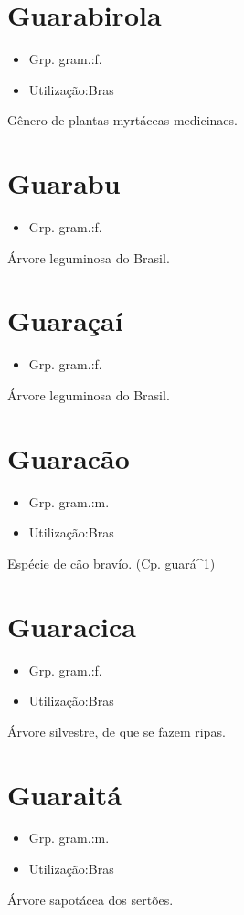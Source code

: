 \section{Guarabirola}
\begin{itemize}
\item {Grp. gram.:f.}
\end{itemize}
\begin{itemize}
\item {Utilização:Bras}
\end{itemize}
Gênero de plantas myrtáceas medicinaes.
\section{Guarabu}
\begin{itemize}
\item {Grp. gram.:f.}
\end{itemize}
Árvore leguminosa do Brasil.
\section{Guaraçaí}
\begin{itemize}
\item {Grp. gram.:f.}
\end{itemize}
Árvore leguminosa do Brasil.
\section{Guaracão}
\begin{itemize}
\item {Grp. gram.:m.}
\end{itemize}
\begin{itemize}
\item {Utilização:Bras}
\end{itemize}
Espécie de cão bravío.
(Cp. \textunderscore guará\textunderscore ^1)
\section{Guaracica}
\begin{itemize}
\item {Grp. gram.:f.}
\end{itemize}
\begin{itemize}
\item {Utilização:Bras}
\end{itemize}
Árvore silvestre, de que se fazem ripas.
\section{Guaraitá}
\begin{itemize}
\item {Grp. gram.:m.}
\end{itemize}
\begin{itemize}
\item {Utilização:Bras}
\end{itemize}
Árvore sapotácea dos sertões.
